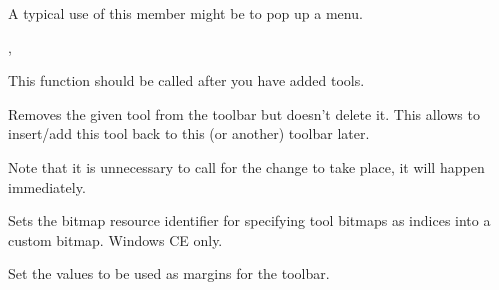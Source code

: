 


A typical use of this member might be to pop up a menu.


,\rtfsp
{}

\label{wxtoolbarrealize}


This function should be called after you have added tools.

\label{wxtoolbarremovetool}


Removes the given tool from the toolbar but doesn't delete it. This allows to
insert/add this tool back to this (or another) toolbar later.

Note that it is unnecessary to call  for the
change to take place, it will happen immediately.



\label{wxtoolbarsetbitmapresource}


Sets the bitmap resource identifier for specifying tool bitmaps as indices
into a custom bitmap. Windows CE only.

\label{wxtoolbarsetmargins}



Set the values to be used as margins for the toolbar.





